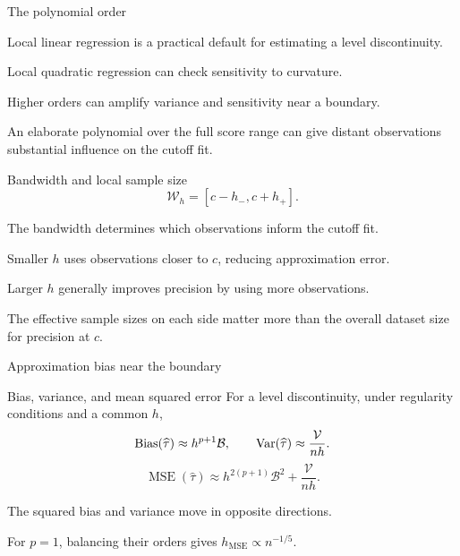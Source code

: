 \begin{frame}{The polynomial order}
\begin{items}
\item Local linear regression is a practical default for estimating a level discontinuity.
\item Local quadratic regression can check sensitivity to curvature.
\item Higher orders can amplify variance and sensitivity near a boundary.
\item An elaborate polynomial over the full score range can give distant observations substantial influence on the cutoff fit.
\end{items}
\end{frame}

\begin{frame}{Bandwidth and local sample size}
\[
\mathcal W_h=[c-h_-,c+h_+].
\]
\begin{items}
\item The bandwidth determines which observations inform the cutoff fit.
\item Smaller $h$ uses observations closer to $c$, reducing approximation error.
\item Larger $h$ generally improves precision by using more observations.
\item The effective sample sizes on each side matter more than the overall dataset size for precision at $c$.
\end{items}
\end{frame}

\begin{frame}{Approximation bias near the boundary}
\end{frame}

\begin{frame}{Bias, variance, and mean squared error}
For a level discontinuity, under regularity conditions and a common $h$,
\[
\operatorname{Bias}(\widehat\tau)\approx h^{p+1}\mathcal B,
\qquad
\operatorname{Var}(\widehat\tau)\approx\frac{\mathcal V}{nh}.
\]
\[
\operatorname{MSE}(\widehat\tau)
\approx h^{2(p+1)}\mathcal B^2+\frac{\mathcal V}{nh}.
\]
\begin{items}
\item The squared bias and variance move in opposite directions.
\item For $p=1$, balancing their orders gives $h_{\mathrm{MSE}}\propto n^{-1/5}$.
\end{items}
\end{frame}

